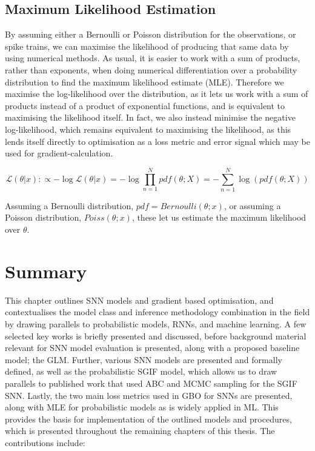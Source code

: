 \documentclass[mphil,deptreport,ianc]{infthesis} %
\begin{document}
\subsection{Maximum Likelihood Estimation}

By assuming either a Bernoulli or Poisson distribution for the observations, or spike trains, we can maximise the likelihood of producing that same data by using numerical methods.
As usual, it is easier to work with a sum of products, rather than exponents, when doing numerical differentiation over a probability distribution to find the maximum likelihood estimate (MLE).
Therefore we maximise the log-likelihood over the distribution, as it lets us work with a sum of products instead of a product of exponential functions, and is equivalent to maximising the likelihood itself.
In fact, we also instead minimise the negative log-likelihood, which remains equivalent to maximising the likelihood, as this lends itself directly to optimisation as a loss metric and error signal which may be used for gradient-calculation.

\begin{equation}
    \mathcal{L}(\theta | x) :\propto - \log \mathcal{L}(\theta | x) = - \log \prod_{n=1}^N pdf(\theta; X) = - \sum_{n=1}^N \log (pdf(\theta; X))
\end{equation}

Assuming a Bernoulli distribution, $pdf=Bernoulli(\theta; x)$, or assuming a Poisson distribution, $Poiss(\theta; x)$, these let us estimate the maximum likelihood over $\theta$.


\section{Summary}

This chapter outlines SNN models and gradient based optimisation, and contextualises the model class and inference methodology combination in the field by drawing parallels to probabilistic models, RNNs, and machine learning.
A few selected key works is briefly presented and discussed, before background material relevant for SNN model evaluation is presented, along with a proposed baseline model; the GLM.
Further, various SNN models are presented and formally defined, as well as the probabilistic SGIF model, which allows us to draw parallels to published work that used ABC and MCMC sampling for the SGIF SNN.
Lastly, the two main loss metrics used in GBO for SNNs are presented, along with MLE for probabilistic models as is widely applied in ML.
This provides the basis for implementation of the outlined models and procedures, which is presented throughout the remaining chapters of this thesis.
The contributions include:
\end{document}
